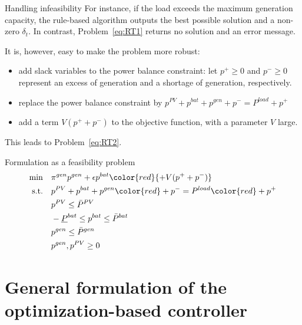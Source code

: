 \begin{frame}{Handling infeasibility}
For instance, if the load exceeds the maximum generation capacity, the rule-based algorithm outputs the best possible solution and a non-zero $\delta_t$. 
In contrast, Problem~\eqref{eq:RT1} returns no solution and an error message. 

It is, however, easy to make the problem more robust: 
\begin{itemize}
    \item add slack variables to the power balance constraint: let $p^+ \geq 0$ and $p^- \geq 0$ represent an excess of generation and a shortage of generation, respectively. 
    \item replace the power balance constraint by $p^{PV}+p^{bat}+p^{gen} + p^-= P^{load} + p^+$
    \item add a term $V (p^+ + p^-)$ to the objective function, with a parameter $V$ large.
\end{itemize} 

This leads to Problem~\eqref{eq:RT2}.
\end{frame}

\begin{frame}{Formulation as a feasibility problem}
\begin{subequations}
	\label{eq:RT2}
\begin{align}
\min        \quad  & \pi^{gen} p^{gen}  + \epsilon p^{bat} \color{red}{+ V (p^+ + p^-)} \label{eq:obj_2}\\
\text{s.t.} \quad  & p^{PV}+p^{bat} +p^{gen} {\color{red}+ p^-}  = P^{load} {\color{red} + p^+}  \label{eq:bal_2} \\
                   & p^{PV} \leq \bar{P}^{PV}  \label{eq:PV_2}\\
                   & -\underline{P}^{bat} \leq p^{bat} \leq \bar{P}^{bat}  \label{eq:bat_2}\\
                   & p^{gen} \leq \bar{P}^{gen}  \label{eq:gen_2}\\
                   & p^{gen}, p^{PV}  \geq 0  \label{eq:nonneg_2}
\end{align}
\end{subequations}


\end{frame}

\section[General formulation of the optimization-based controller]{General formulation of the\\ optimization-based controller}

